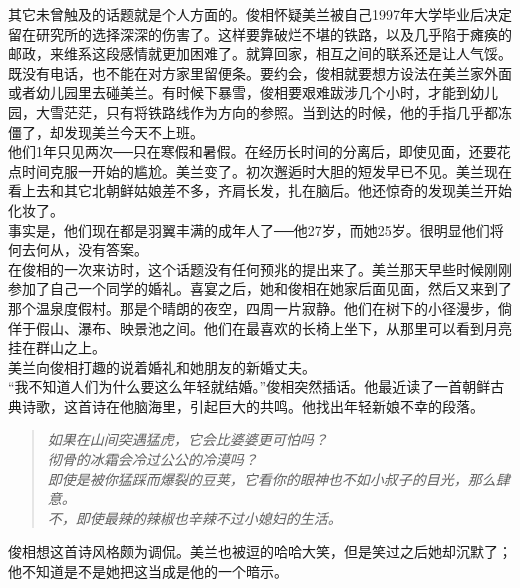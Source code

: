 其它未曾触及的话题就是个人方面的。俊相怀疑美兰被自己1997年大学毕业后决定留在研究所的选择深深的伤害了。这样要靠破烂不堪的铁路，以及几乎陷于瘫痪的邮政，来维系这段感情就更加困难了。就算回家，相互之间的联系还是让人气馁。既没有电话，也不能在对方家里留便条。要约会，俊相就要想方设法在美兰家外面或者幼儿园里去碰美兰。有时候下暴雪，俊相要艰难跋涉几个小时，才能到幼儿园，大雪茫茫，只有将铁路线作为方向的参照。当到达的时候，他的手指几乎都冻僵了，却发现美兰今天不上班。\\

他们1年只见两次──只在寒假和暑假。在经历长时间的分离后，即使见面，还要花点时间克服一开始的尴尬。美兰变了。初次邂逅时大胆的短发早已不见。美兰现在看上去和其它北朝鲜姑娘差不多，齐肩长发，扎在脑后。他还惊奇的发现美兰开始化妆了。\\

事实是，他们现在都是羽翼丰满的成年人了──他27岁，而她25岁。很明显他们将何去何从，没有答案。\\

在俊相的一次来访时，这个话题没有任何预兆的提出来了。美兰那天早些时候刚刚参加了自己一个同学的婚礼。喜宴之后，她和俊相在她家后面见面，然后又来到了那个温泉度假村。那是个晴朗的夜空，四周一片寂静。他们在树下的小径漫步，倘佯于假山、瀑布、映景池之间。他们在最喜欢的长椅上坐下，从那里可以看到月亮挂在群山之上。\\

美兰向俊相打趣的说着婚礼和她朋友的新婚丈夫。\\

“我不知道人们为什么要这么年轻就结婚。”俊相突然插话。他最近读了一首朝鲜古典诗歌，这首诗在他脑海里，引起巨大的共鸣。他找出年轻新娘不幸的段落。\\

\begin{quote}
	\begin{spacing}{1.0}  %
		\textit{{\footnotesize 	如果在山间突遇猛虎，它会比婆婆更可怕吗？\\
		彻骨的冰霜会冷过公公的冷漠吗？\\
		即使是被你猛踩而爆裂的豆荚，它看你的眼神也不如小叔子的目光，那么肆意。\\
		不，即使最辣的辣椒也辛辣不过小媳妇的生活。\\}}
	\end{spacing}
\end{quote}

俊相想这首诗风格颇为调侃。美兰也被逗的哈哈大笑，但是笑过之后她却沉默了；他不知道是不是她把这当成是他的一个暗示。\\

